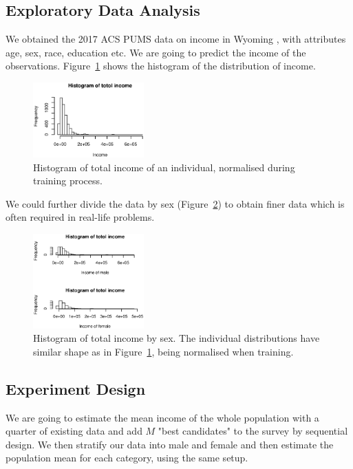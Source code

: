 \subsection{Exploratory Data Analysis}

We obtained the 2017 ACS PUMS data on income in Wyoming \cite{ACS}, with attributes age, sex, race, education etc. We are going to predict the income of the observations. Figure~\ref{fig:income} shows the histogram of the distribution of income.

\begin{figure}[tbh!]
    \centering
    \includegraphics[width = 0.38\textwidth]{6.Real_Data_Sets/income.eps}
    \caption{Histogram of total income of an individual, normalised during training process.}
    \label{fig:income}
\end{figure}

We could further divide the data by sex (Figure~\ref{fig:by_sex}) to obtain finer data which is often required in real-life problems.

\begin{figure}[tbh!]
    \centering
    \includegraphics[width = 0.38\textwidth]{6.Real_Data_Sets/by_sex.eps}
    \caption{Histogram of total income by sex. The individual distributions have similar shape as in Figure~\ref{fig:income}, being normalised when training.}
    \label{fig:by_sex}
\end{figure}

\subsection{Experiment Design}
We are going to estimate the mean income of the whole population with a quarter of existing data and add $M$ "best candidates" to the survey by sequential design. We then stratify our data into male and female and then estimate the population mean for each category, using the same setup.

